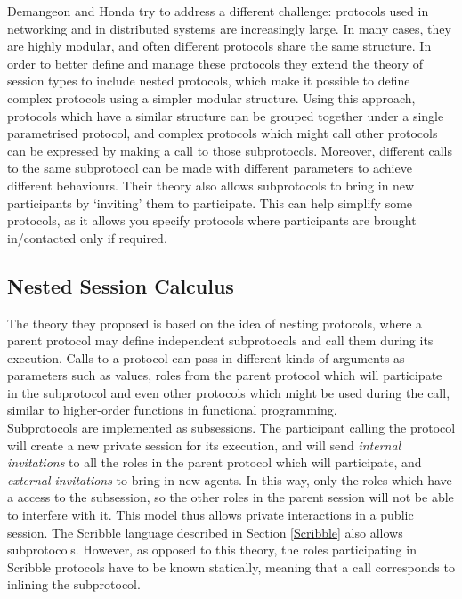 \documentclass[12pt,twoside]{report}
\begin{document}
Demangeon and Honda \cite{nestedprotocols} try to address a different challenge: protocols used in networking and in distributed systems are increasingly large. In many cases, they are highly modular, and often different protocols share the same structure. In order to better define and manage these protocols they extend the theory of session types to include nested protocols, which make it possible to define complex protocols using a simpler modular structure. Using this approach, protocols which have a similar structure can be grouped together under a single parametrised protocol, and complex protocols which might call other protocols can be expressed by making a call to those subprotocols. Moreover, different calls to the same subprotocol can be made with different parameters to achieve different behaviours. Their theory also allows subprotocols to bring in new participants by `inviting' them to participate. This can help simplify some protocols, as it allows you specify protocols where participants are brought in/contacted only if required.

\subsection{Nested Session Calculus}
The theory they proposed is based on the idea of nesting protocols, where a parent protocol may define independent subprotocols and call them during its execution. Calls to a protocol can pass in different kinds of arguments as parameters such as values, roles from the parent protocol which will participate in the subprotocol and even other protocols which might be used during the call, similar to higher-order functions in functional programming.\\ 

Subprotocols are implemented as subsessions. The participant calling the protocol will create a new private session for its execution, and will send \textit{internal invitations} to all the roles in the parent protocol which will participate, and \textit{external invitations} to bring in new agents. In this way, only the roles which have a access to the subsession, so the other roles in the parent session will not be able to interfere with it. This model thus allows private interactions in a public session. The Scribble language described in Section \ref{Scribble} also allows subprotocols. However, as opposed to this theory, the roles participating in Scribble protocols have to be known statically, meaning that a call corresponds to inlining the subprotocol.\\
\end{document}
